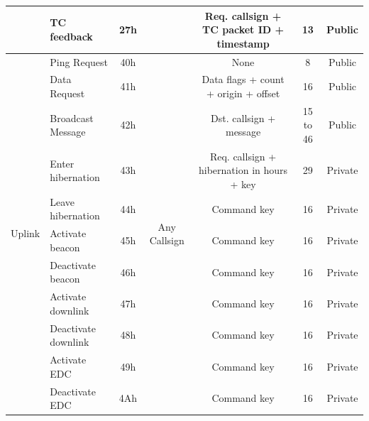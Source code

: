 \begin{landscape}
\begin{table}[ht]
\begin{tabular}{llccccc}
                                      & TC feedback           & 27h &                                     & Req. callsign + TC packet ID + timestamp   & 13                    & Public \\
            \midrule
            \multirow{14}{*}{Uplink}  & Ping Request          & 40h & \multirow{14}{*}{Any Callsign}      & None                                       & 8                     & Public \\
                                      & Data Request          & 41h &                                     & Data flags + count + origin + offset       & 16                    & Public \\
                                      & Broadcast Message     & 42h &                                     & Dst. callsign + message                    & 15 to 46              & Public \\
                                      & Enter hibernation     & 43h &                                     & Req. callsign + hibernation in hours + key & 29                    & Private \\
                                      & Leave hibernation     & 44h &                                     & Command key                                & 16                    & Private \\
                                      & Activate beacon       & 45h &                                     & Command key                                & 16                    & Private \\
                                      & Deactivate beacon     & 46h &                                     & Command key                                & 16                    & Private \\
                                      & Activate downlink     & 47h &                                     & Command key                                & 16                    & Private \\
                                      & Deactivate downlink   & 48h &                                     & Command key                                & 16                    & Private \\
                                      & Activate EDC          & 49h &                                     & Command key                                & 16                    & Private \\
                                      & Deactivate EDC        & 4Ah &                                     & Command key                                & 16                    & Private \\

\end{tabular}
\end{table}
\end{landscape}
